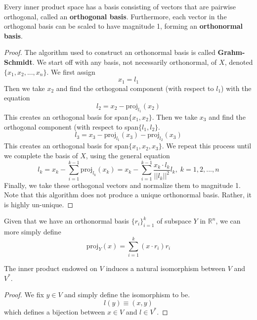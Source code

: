   \begin{theorem}
    Every inner product space has a basis consisting of vectors that are pairwise orthogonal, called an \textbf{orthogonal basis}. Furthermore, each vector in the orthogonal basis can be scaled to have magnitude 1, forming an \textbf{orthonormal basis}.  
  \end{theorem}

  \begin{proof}
    The algorithm used to construct an orthonormal basis is called \textbf{Grahm-Schmidt}. We start off with any basis, not necessarily orthonormal, of $X$, denoted $\{x_1, x_2, ..., x_n\}$. We first assign 
    \begin{equation}
      x_1 = l_1
    \end{equation}
    Then we take $x_2$ and find the orthogonal component (with respect to $l_1$) with the equation
    \begin{equation}
      l_2 = x_2 - \text{proj}_{l_1} (x_2)
    \end{equation}
    This creates an orthogonal basis for span$\{x_1, x_2\}$. Then we take $x_3$ and find the orthogonal component (with respect to span$\{l_1, l_2\}$. 
    \begin{equation}
      l_3 = x_3 - \text{proj}_{l_1} (x_3) - \text{proj}_{l_2} (x_3)
    \end{equation}
    This creates an orthogonal basis for span$\{x_1, x_2, x_3\}$. We repeat this process until we complete the basis of $X$, using the general equation
    \begin{equation}
      l_k = x_k - \sum_{i=1}^{k-1} \text{proj}_{l_k} (x_k) = x_k - \sum_{i=1}^{k-1} \frac{x_k \cdot l_k}{||l_k||^2} l_k, \; k = 1, 2, ..., n
    \end{equation}
    Finally, we take these orthogonal vectors and normalize them to magnitude 1. Note that this algorithm does not produce a unique orthonormal basis. Rather, it is highly un-unique. 
  \end{proof}

  Given that we have an orthonormal basis $\{r_i\}_{i=1}^k$ of subspace $Y$ in $\mathbb{R}^n$, we can more simply define 
  \begin{equation}
    \text{proj}_Y (x) = \sum_{i=1}^k (x \cdot r_i) r_i
  \end{equation}

  \begin{theorem}
    The inner product endowed on $V$ induces a natural isomorphism between $V$ and $V^\ast$. 
  \end{theorem}
  \begin{proof}
    We fix $y \in V$ and simply define the isomorphism to be. 
    \begin{equation}
      l(y) \equiv (x, y)
    \end{equation}
    which defines a bijection between $x \in V$ and $l \in V^*$. 
  \end{proof}

